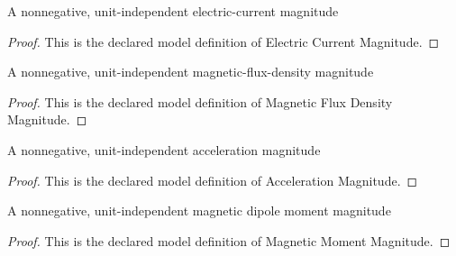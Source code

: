 \begin{definition}
  \label{def:physics:phyx-mini-0954:phyxminiproblems-problemphyxmini0954-electriccurrentmagnitude}
  A nonnegative, unit-independent electric-current magnitude
\end{definition}
\begin{proof}
  This is the declared model definition of Electric Current Magnitude.
\end{proof}
\begin{definition}
  \label{def:physics:phyx-mini-0954:phyxminiproblems-problemphyxmini0954-magneticfluxdensitymagnitude}
  A nonnegative, unit-independent magnetic-flux-density magnitude
\end{definition}
\begin{proof}
  This is the declared model definition of Magnetic Flux Density Magnitude.
\end{proof}
\begin{definition}
  \label{def:physics:phyx-mini-0954:phyxminiproblems-problemphyxmini0954-accelerationmagnitude}
  A nonnegative, unit-independent acceleration magnitude
\end{definition}
\begin{proof}
  This is the declared model definition of Acceleration Magnitude.
\end{proof}
\begin{definition}
  \label{def:physics:phyx-mini-0954:phyxminiproblems-problemphyxmini0954-magneticmomentmagnitude}
  A nonnegative, unit-independent magnetic dipole moment magnitude
\end{definition}
\begin{proof}
  This is the declared model definition of Magnetic Moment Magnitude.
\end{proof}
